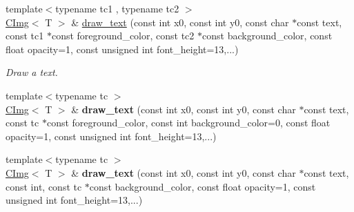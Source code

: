 \begin{DoxyCompactItemize}
\item 
{\footnotesize template$<$typename tc1 , typename tc2 $>$ }\\\hyperlink{structcimg__library_1_1CImg}{CImg}$<$ T $>$ \& \hyperlink{structcimg__library_1_1CImg_a38ccdb901f4538b2f5d674d6938d07e6}{draw\_\-text} (const int x0, const int y0, const char $\ast$const text, const tc1 $\ast$const foreground\_\-color, const tc2 $\ast$const background\_\-color, const float opacity=1, const unsigned int font\_\-height=13,...)
\begin{DoxyCompactList}\small\item\em Draw a text. \item\end{DoxyCompactList}\item 
\hypertarget{structcimg__library_1_1CImg_ab93ebaa857337a43c42f5e43b186db01}{
{\footnotesize template$<$typename tc $>$ }\\\hyperlink{structcimg__library_1_1CImg}{CImg}$<$ T $>$ \& {\bfseries draw\_\-text} (const int x0, const int y0, const char $\ast$const text, const tc $\ast$const foreground\_\-color, const int background\_\-color=0, const float opacity=1, const unsigned int font\_\-height=13,...)}
\label{structcimg__library_1_1CImg_ab93ebaa857337a43c42f5e43b186db01}

\item 
\hypertarget{structcimg__library_1_1CImg_a9b9a80493849ed6b988cdd7d8e10a2ab}{
{\footnotesize template$<$typename tc $>$ }\\\hyperlink{structcimg__library_1_1CImg}{CImg}$<$ T $>$ \& {\bfseries draw\_\-text} (const int x0, const int y0, const char $\ast$const text, const int, const tc $\ast$const background\_\-color, const float opacity=1, const unsigned int font\_\-height=13,...)}
\label{structcimg__library_1_1CImg_a9b9a80493849ed6b988cdd7d8e10a2ab}


\end{DoxyCompactItemize}
